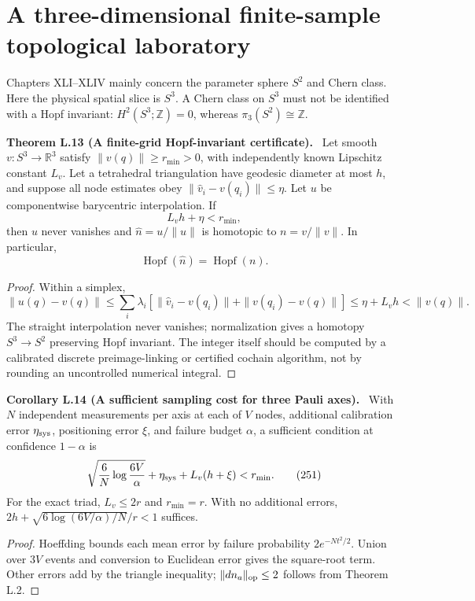 \documentclass[11pt,a4paper,oneside]{book}
\newcommand{\R}{\mathbb R}\newcommand{\C}{\mathbb C}\newcommand{\Z}{\mathbb Z}\newcommand{\N}{\mathbb N}\newcommand{\Q}{\mathbb Q}
\newcommand{\statement}[3]{\par\medskip\noindent\textbf{#1 #2 (#3).}\ }
\begin{document}
\section{A three-dimensional finite-sample topological laboratory}
Chapters XLI--XLIV mainly concern the parameter sphere $S^2$ and Chern class. Here the physical spatial slice is $S^3$. A Chern class on $S^3$ must not be identified with a Hopf invariant: $H^2(S^3;\Z)=0$, whereas $\pi_3(S^2)\cong\Z$.
\statement{Theorem}{L.13}{A finite-grid Hopf-invariant certificate}
Let smooth $v:S^3\to\R^3$ satisfy $\|v(q)\|\ge r_{\min}>0$, with independently known Lipschitz constant $L_v$. Let a tetrahedral triangulation have geodesic diameter at most $h$, and suppose all node estimates obey $\|\widehat v_i-v(q_i)\|\le\eta$. Let $u$ be componentwise barycentric interpolation. If
\begin{equation}L_vh+\eta<r_{\min},\tag{249}\end{equation}
then $u$ never vanishes and $\widehat n=u/\|u\|$ is homotopic to $n=v/\|v\|$. In particular,
\begin{equation}\operatorname{Hopf}(\widehat n)=\operatorname{Hopf}(n).\tag{250}\end{equation}
\begin{proof}
Within a simplex,
\[\|u(q)-v(q)\|\le\sum_i\lambda_i[\|\widehat v_i-v(q_i)\|+\|v(q_i)-v(q)\|]\le\eta+L_vh<\|v(q)\|.\]
The straight interpolation never vanishes; normalization gives a homotopy $S^3\to S^2$ preserving Hopf invariant. The integer itself should be computed by a calibrated discrete preimage-linking or certified cochain algorithm, not by rounding an uncontrolled numerical integral.
\end{proof}
\statement{Corollary}{L.14}{A sufficient sampling cost for three Pauli axes}
With $N$ independent measurements per axis at each of $V$ nodes, additional calibration error $\eta_{\rm sys}$, positioning error $\xi$, and failure budget $\alpha$, a sufficient condition at confidence $1-\alpha$ is
\begin{equation}\sqrt{\frac6N\log\frac{6V}\alpha}+\eta_{\rm sys}+L_v(h+\xi)<r_{\min}.\tag{251}\end{equation}
For the exact triad, $L_v\le2r$ and $r_{\min}=r$. With no additional errors, $2h+\sqrt{6\log(6V/\alpha)/N}/r<1$ suffices.
\begin{proof}
Hoeffding bounds each mean error by failure probability $2e^{-Nt^2/2}$. Union over $3V$ events and conversion to Euclidean error gives the square-root term. Other errors add by the triangle inequality; $\|dn_a\|_{\rm op}\le2$ follows from Theorem L.2.
\end{proof}
\end{document}
